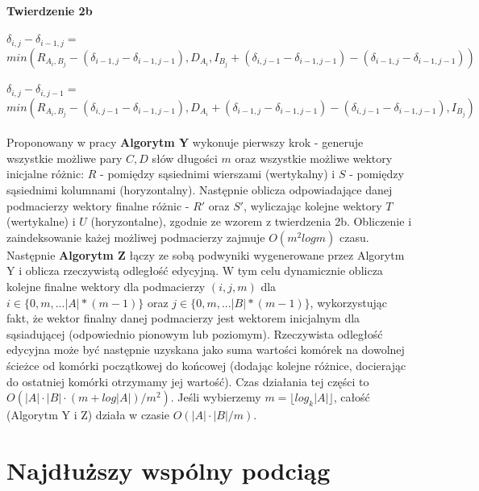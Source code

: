 \documentclass[12pt]{article}
\begin{document}
\noindent \textbf{Twierdzenie 2b}\\\\
$\delta_{i, j} - \delta_{i-1, j} =$\\
$min(R_{A_i,B_j} - (\delta_{i-1,j} - \delta_{i-1,j-1}), D_A_i, I_B_j + (\delta_{i,j-1} - \delta_{i-1,j-1}) - (\delta_{i-1,j} - \delta_{i-1,j-1}))$\\\\
$\delta_{i, j} - \delta_{i, j-1} =$\\
$min(R_{A_i,B_j} - (\delta_{i,j-1} - \delta_{i-1,j-1}), D_A_i + (\delta_{i-1,j} - \delta_{i-1,j-1}) - (\delta_{i,j-1} - \delta_{i-1,j-1}), I_B_j)$\\\\

\noindent Proponowany w pracy \textbf{Algorytm Y} wykonuje pierwszy krok - generuje wszystkie możliwe pary $C, D$ słów długości $m$ oraz wszystkie możliwe wektory inicjalne różnic:  $R$ - pomiędzy sąsiednimi wierszami (wertykalny) i $S$ - pomiędzy sąsiednimi kolumnami (horyzontalny). Następnie oblicza odpowiadające danej podmacierzy wektory finalne różnic - $R'$ oraz $S'$, wyliczając kolejne wektory $T$ (wertykalne) i $U$ (horyzontalne), zgodnie ze wzorem z twierdzenia 2b. Obliczenie i zaindeksowanie każej możliwej podmacierzy zajmuje $O(m^2log m)$ czasu.\\

\noindent Następnie \textbf{Algorytm Z} łączy ze sobą podwyniki wygenerowane przez Algorytm Y i oblicza rzeczywistą odległość edycyjną. W tym celu dynamicznie oblicza kolejne finalne wektory dla podmacierzy $(i,j,m)$ dla $i \in \{0,m,...|A|*(m-1)\}$ oraz $j \in \{0,m,...|B|*(m-1)\}$, wykorzystując fakt, że wektor finalny danej podmacierzy jest wektorem inicjalnym dla sąsiadującej (odpowiednio pionowym lub poziomym). Rzeczywista odległość edycyjna może być następnie uzyskana jako suma wartości komórek na dowolnej ścieżce od komórki początkowej do końcowej (dodając kolejne różnice, docierając do ostatniej komórki otrzymamy jej wartość). Czas działania tej części to $O(|A| \cdot |B| \cdot (m+log|A|)/m^2)$. Jeśli wybierzemy $m = \lfloor log_k|A| \rfloor$, całość (Algorytm Y i Z) działa w czasie $O(|A| \cdot |B|/m)$.

\section{Najdłuższy wspólny podciąg}
\end{document}
